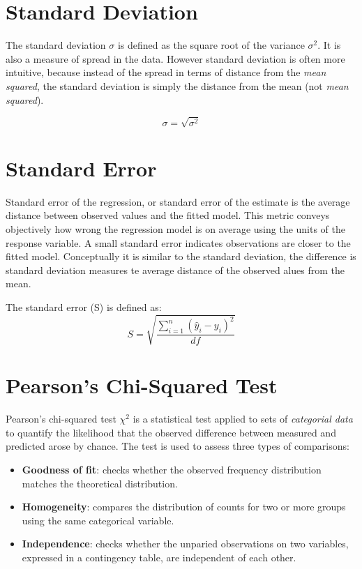 \section{Standard Deviation}

The standard deviation $\sigma$ is defined as the square root of the variance
$\sigma^{2}$. It is also a measure of spread in the data. However standard
deviation is often more intuitive, because instead of the spread in terms of
distance from the \textit{mean squared}, the standard deviation is simply the
distance from the mean (not \textit{mean squared}).

\begin{equation}
  \sigma = \sqrt{\sigma^2}
\end{equation}



\section{Standard Error}

Standard error of the regression, or standard error of the estimate is the
average distance between observed values and the fitted model. This metric
conveys objectively how wrong the regression model is on average using the
units of the response variable. A small standard error indicates observations
are closer to the fitted model. Conceptually it is similar to the standard
deviation, the difference is standard deviation measures te average distance of
the observed alues from the mean.

The standard error (S) is defined as:
%
\begin{equation}
  S = \sqrt{\dfrac{\sum_{i=1}^{n} (\hat{y}_{i} - y_{i})^{2}}{df}}
\end{equation}



\section{Pearson's Chi-Squared Test}

Pearson's chi-squared test $\chi^2$ is a statistical test applied to sets of
\textit{categorial data} to quantify the likelihood that the observed
difference between measured and predicted arose by chance. The test is used to
assess three types of comparisons:
%
\begin{itemize}
  \item{\textbf{Goodness of fit}: checks whether the observed frequency
    distribution matches the theoretical distribution.}
  \item{\textbf{Homogeneity}: compares the distribution of counts for two or
    more groups using the same categorical variable.}
  \item{\textbf{Independence}: checks whether the unparied observations on two
    variables, expressed in a contingency table, are independent of each
    other.}
\end{itemize}


